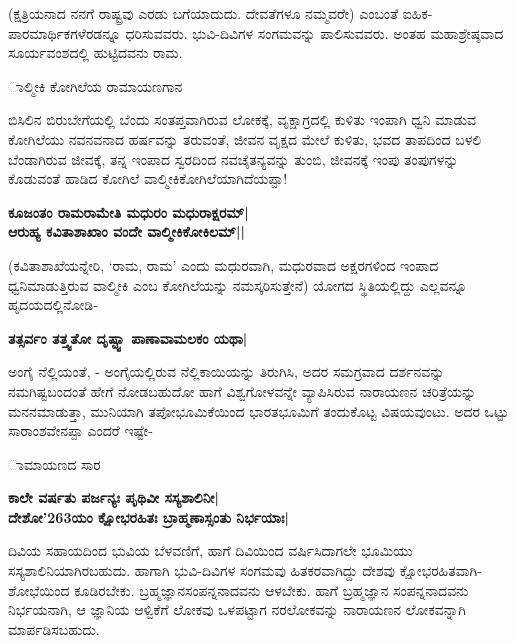 (ಕ್ಷತ್ರಿಯನಾದ ನನಗೆ ರಾಷ್ಟ್ರವು ಎರಡು ಬಗೆಯಾದುದು. ದೇವತೆಗಳೂ ನಮ್ಮವರೇ) ಎಂಬಂತೆ ಐಹಿಕ-ಪಾರಮಾರ್ಥಿಕಗಳೆರಡನ್ನೂ ಧರಿಸುವವರು. ಭುವಿ-ದಿವಿಗಳ ಸಂಗಮವನ್ನು ಪಾಲಿಸುವವರು. ಅಂತಹ ಮಹಾಶ್ರೇಷ್ಠವಾದ ಸೂರ್ಯವಂಶದಲ್ಲಿ ಹುಟ್ಟಿದವನು ರಾಮ. 


\large{ಾಲ್ಮೀಕಿ ಕೋಗಿಲೆಯ ರಾಮಾಯಣಗಾನ} 


ಬಿಸಿಲಿನ ಬಿರುಬೇಗೆಯಲ್ಲಿ ಬೆಂದು ಸಂತಪ್ತವಾಗಿರುವ ಲೋಕಕ್ಕೆ, ವೃಕ್ಷಾಗ್ರದಲ್ಲಿ ಕುಳಿತು ಇಂಪಾಗಿ ಧ್ವನಿ ಮಾಡುವ ಕೋಗಿಲೆಯು ನವನವನಾದ ಹರ್ಷವನ್ನು ತರುವಂತೆ, ಜೀವನ ವೃಕ್ಷದ ಮೇಲೆ ಕುಳಿತು, ಭವದ ತಾಪದಿಂದ ಬಳಲಿ ಬೆಂಡಾಗಿರುವ ಜೀವಕ್ಕೆ, ತನ್ನ ಇಂಪಾದ ಸ್ವರದಿಂದ ನವಚೈತನ್ಯವನ್ನು ತುಂಬಿ, ಜೀವನಕ್ಕೆ ಇಂಪು ತಂಪುಗಳನ್ನು ಕೊಡುವಂತೆ ಹಾಡಿದ ಕೋಗಿಲೆ ವಾಲ್ಮೀಕಿಕೋಗಿಲೆಯಾಗಿದೆಯಪ್ಪಾ! 


\begin{center} 

{\bf ಕೂಜಂತಂ ರಾಮರಾಮೇತಿ ಮಧುರಂ ಮಧುರಾಕ್ಷರಮ್‍|\\ 

ಆರುಹ್ಯ ಕವಿತಾಶಾಖಾಂ ವಂದೇ ವಾಲ್ಮೀಕಿಕೋಕಿಲಮ್‍||} 

\end{center} 


(ಕವಿತಾಶಾಖೆಯನ್ನೇರಿ, `ರಾಮ, ರಾಮ' ಎಂದು ಮಧುರವಾಗಿ, ಮಧುರವಾದ ಅಕ್ಷರಗಳಿಂದ ಇಂಪಾದ ಧ್ವನಿಮಾಡುತ್ತಿರುವ ವಾಲ್ಮೀಕಿ ಎಂಬ ಕೋಗಿಲೆಯನ್ನು ನಮಸ್ಕರಿಸುತ್ತೇನೆ) ಯೋಗದ ಸ್ಥಿತಿಯಲ್ಲಿದ್ದು ಎಲ್ಲವನ್ನೂ ಹೃದಯದಲ್ಲಿನೋಡಿ- 


\begin{center} 

{\bf ತತ್ಸರ್ವಂ ತತ್ತ್ವತೋ ದೃಷ್ಟ್ವಾ ಪಾಣಾವಾಮಲಕಂ ಯಥಾ|} 

\end{center} 


ಅಂಗೈ ನೆಲ್ಲಿಯಂತೆ, - ಅಂಗೈಯಲ್ಲಿರುವ ನೆಲ್ಲಿಕಾಯಿಯನ್ನು ತಿರುಗಿಸಿ, ಅದರ ಸಮಗ್ರವಾದ ದರ್ಶನವನ್ನು ನಮಗಿಷ್ಟಬಂದಂತೆ ಹೇಗೆ ನೋಡಬಹುದೋ ಹಾಗೆ ವಿಶ್ವಗೋಳವನ್ನೇ ವ್ಯಾಪಿಸಿರುವ ನಾರಾಯಣನ ಚರಿತ್ರೆಯನ್ನು ಮನನಮಾಡುತ್ತಾ, ಮುನಿಯಾಗಿ ತಪೋಭೂಮಿಕೆಯಿಂದ ಭಾರತಭೂಮಿಗೆ ತಂದುಕೊಟ್ಟ ವಿಷಯವುಂಟು. ಅದರ ಒಟ್ಟು ಸಾರಾಂಶವೇನಪ್ಪಾ ಎಂದರೆ ಇಷ್ಟೇ- 


\large{ಾಮಾಯಣದ ಸಾರ} 


\begin{center} 

{\bf ಕಾಲೇ ವರ್ಷತು ಪರ್ಜನ್ಯಃ ಪೃಥಿವೀ ಸಸ್ಯಶಾಲಿನೀ|\\ 

ದೇಶೋ\char'263ಯಂ ಕ್ಷೋಭರಹಿತಃ ಬ್ರಾಹ್ಮಣಾಸ್ಸಂತು ನಿರ್ಭಯಾಃ|} 

\end{center} 


ದಿವಿಯ ಸಹಾಯದಿಂದ ಭುವಿಯ ಬೆಳವಣಿಗೆ, ಹಾಗೆ ದಿವಿಯಿಂದ ವರ್ಷಿಸಿದಾಗಲೇ ಭೂಮಿಯು ಸಸ್ಯಶಾಲಿನಿಯಾಗಿರಬಹುದು. ಹಾಗಾಗಿ ಭುವಿ-ದಿವಿಗಳ ಸಂಗಮವು ಹಿತಕರವಾಗಿದ್ದು ದೇಶವು ಕ್ಷೋಭರಹಿತವಾಗಿ-ಶೋಭೆಯಿಂದ ಕೂಡಿರಬೇಕು. ಬ್ರಹ್ಮಜ್ಞಾನಸಂಪನ್ನನಾದವನು ಆಳಬೇಕು. ಹಾಗೆ ಬ್ರಹ್ಮಜ್ಞಾನ ಸಂಪನ್ನನಾದವನು ನಿರ್ಭಯನಾಗಿ, ಆ ಜ್ಞಾನಿಯ ಆಳ್ವಿಕೆಗೆ ಲೋಕವು ಒಳಪಟ್ಟಾಗ ನರಲೋಕವನ್ನು ನಾರಾಯಣನ ಲೋಕವನ್ನಾಗಿ ಮಾರ್ಪಡಿಸಬಹುದು. 


